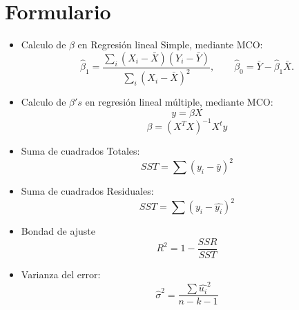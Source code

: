 \documentclass[10pt,a4paper]{article}
\begin{document}
\newpage
\section{Formulario}
\begin{itemize}

\item Calculo de $\beta$ en Regresión lineal Simple, mediante MCO:
\[
\hat{\beta}_1=\frac{\sum_i (X_i-\bar{X})(Y_i-\bar{Y})}{\sum_i (X_i-\bar{X})^2},\qquad
\hat{\beta}_0=\bar{Y}-\hat{\beta}_1\bar{X}.
\]
\item Calculo de $\beta's$ en regresión lineal múltiple, mediante MCO:
$$y = \beta X$$
$$\beta = (X^TX)^{-1}X^ty$$


\item Suma de cuadrados Totales:
$$SST=\sum (y_i-\bar{y})^2$$

\item Suma de cuadrados Residuales:
$$SST=\sum (y_i-\hat{y_i})^2$$

\item Bondad de ajuste
$$R^2 = 1-\frac{SSR}{SST}$$

\item Varianza del error:
$$\hat{\sigma}^2=\frac{\sum \hat{u_i}^2}{n-k-1}$$


\end{itemize}
\end{document}
